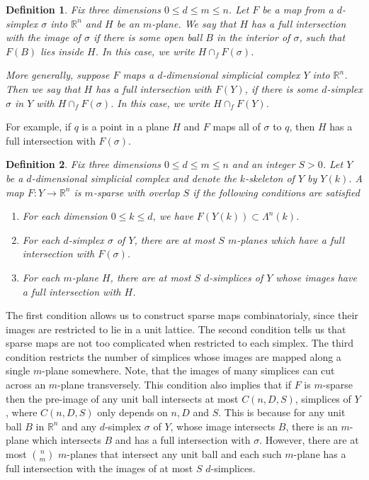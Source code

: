 \documentclass[12pt]{article}
\newtheorem{definition}{Definition}
\newcommand{\RR}{\mathbb{R}}
\begin{document}
	\begin{definition} Fix three dimensions $0 \le d \le m \le n$. Let $F$ be a map from a $d$-simplex $\sigma$ into $\RR^n$ and $H$ be an $m$-plane. We say that $H$ has a full intersection with the image of $\sigma$ if there is some open ball $B$ in the interior of $\sigma$, such that $F(B)$ lies inside $H$. In this case, we write $H \cap_f F(\sigma)$.
	
	More generally, suppose $F$ maps a $d$-dimensional simplicial complex $Y$ into $\RR^n$. Then we say that $H$ has a full intersection with $F(Y)$, if there is some $d$-simplex $\sigma$ in $Y$ with $H \cap_f F(\sigma)$. In this case, we write $H \cap_f F(Y)$.
	
	\end{definition}
	
	For example, if $q$ is a point in a plane $H$ and $F$ maps all of $\sigma$ to $q$, then $H$ has a full intersection with $F(\sigma)$.
	
	\begin{definition} 
		
		\par Fix three dimensions $0 \le d \le m \le n$ and an integer $S > 0$. Let $Y$ be a $d$-dimensional simplicial complex and denote the $k$-skeleton of $Y$ by $Y(k)$. A map $F: Y \to \RR^n$ is $m$-sparse with overlap $S$ if the following conditions are satisfied
		
		\begin{enumerate}
			\item For each dimension $0 \le k \le d$, we have $F(Y(k)) \subset \Lambda^n(k)$.
			\item For each $d$-simplex $\sigma$ of $Y$, there are at most $S$ $m$-planes which have a full intersection with $F(\sigma)$.
			\item For each $m$-plane $H$, there are at most $S$ $d$-simplices of $Y$ whose images have a full intersection with $H$.
		\end{enumerate}
	\end{definition}
	
	\noindent The first condition allows us to construct sparse maps combinatorialy, since their images are restricted to lie in a unit lattice. The second condition tells us that sparse maps are not too complicated when restricted to each simplex. The third condition restricts the number of simplices whose images are mapped along a single $m$-plane somewhere. Note, that the images of many simplices can cut across an $m$-plane transversely. This condition also implies that if $F$ is $m$-sparse then the pre-image of any unit ball intersects at most $C(n,D,S)$, simplices of $Y$, where $C(n,D,S)$ only depends on $n, D$ and $S$. This is because for any unit ball $B$ in $\RR^n$ and any $d$-simplex $\sigma$ of $Y$, whose image intersects $B$, there is an $m$-plane which intersects $B$ and has a full intersection with $\sigma$. However, there are at most ${n \choose m}$ $m$-planes that intersect any unit ball and each such $m$-plane has a full intersection with the images of at most $S$ $d$-simplices.
	
\end{document}
